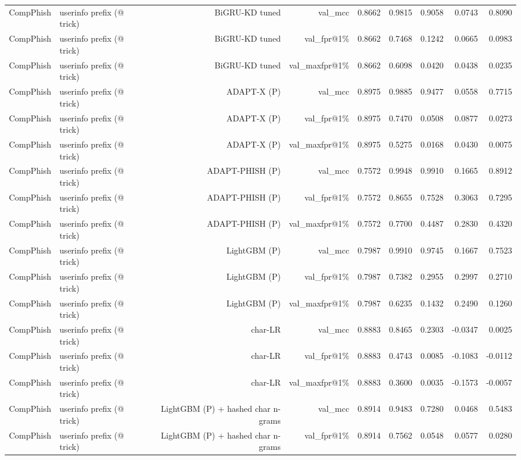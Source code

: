 \begin{table}[t]
\begin{tabular}{llrrrrrrr}
CompPhish & userinfo prefix (@ trick) & BiGRU-KD tuned & val\_mcc & 0.8662 & 0.9815 & 0.9058 & 0.0743 & 0.8090 \\
CompPhish & userinfo prefix (@ trick) & BiGRU-KD tuned & val\_fpr@1\% & 0.8662 & 0.7468 & 0.1242 & 0.0665 & 0.0983 \\
CompPhish & userinfo prefix (@ trick) & BiGRU-KD tuned & val\_maxfpr@1\% & 0.8662 & 0.6098 & 0.0420 & 0.0438 & 0.0235 \\
CompPhish & userinfo prefix (@ trick) & ADAPT-X (P) & val\_mcc & 0.8975 & 0.9885 & 0.9477 & 0.0558 & 0.7715 \\
CompPhish & userinfo prefix (@ trick) & ADAPT-X (P) & val\_fpr@1\% & 0.8975 & 0.7470 & 0.0508 & 0.0877 & 0.0273 \\
CompPhish & userinfo prefix (@ trick) & ADAPT-X (P) & val\_maxfpr@1\% & 0.8975 & 0.5275 & 0.0168 & 0.0430 & 0.0075 \\
CompPhish & userinfo prefix (@ trick) & ADAPT-PHISH (P) & val\_mcc & 0.7572 & 0.9948 & 0.9910 & 0.1665 & 0.8912 \\
CompPhish & userinfo prefix (@ trick) & ADAPT-PHISH (P) & val\_fpr@1\% & 0.7572 & 0.8655 & 0.7528 & 0.3063 & 0.7295 \\
CompPhish & userinfo prefix (@ trick) & ADAPT-PHISH (P) & val\_maxfpr@1\% & 0.7572 & 0.7700 & 0.4487 & 0.2830 & 0.4320 \\
CompPhish & userinfo prefix (@ trick) & LightGBM (P) & val\_mcc & 0.7987 & 0.9910 & 0.9745 & 0.1667 & 0.7523 \\
CompPhish & userinfo prefix (@ trick) & LightGBM (P) & val\_fpr@1\% & 0.7987 & 0.7382 & 0.2955 & 0.2997 & 0.2710 \\
CompPhish & userinfo prefix (@ trick) & LightGBM (P) & val\_maxfpr@1\% & 0.7987 & 0.6235 & 0.1432 & 0.2490 & 0.1260 \\
CompPhish & userinfo prefix (@ trick) & char-LR & val\_mcc & 0.8883 & 0.8465 & 0.2303 & -0.0347 & 0.0025 \\
CompPhish & userinfo prefix (@ trick) & char-LR & val\_fpr@1\% & 0.8883 & 0.4743 & 0.0085 & -0.1083 & -0.0112 \\
CompPhish & userinfo prefix (@ trick) & char-LR & val\_maxfpr@1\% & 0.8883 & 0.3600 & 0.0035 & -0.1573 & -0.0057 \\
CompPhish & userinfo prefix (@ trick) & LightGBM (P) + hashed char n-grams & val\_mcc & 0.8914 & 0.9483 & 0.7280 & 0.0468 & 0.5483 \\
CompPhish & userinfo prefix (@ trick) & LightGBM (P) + hashed char n-grams & val\_fpr@1\% & 0.8914 & 0.7562 & 0.0548 & 0.0577 & 0.0280 \\

\end{tabular}
\end{table}
